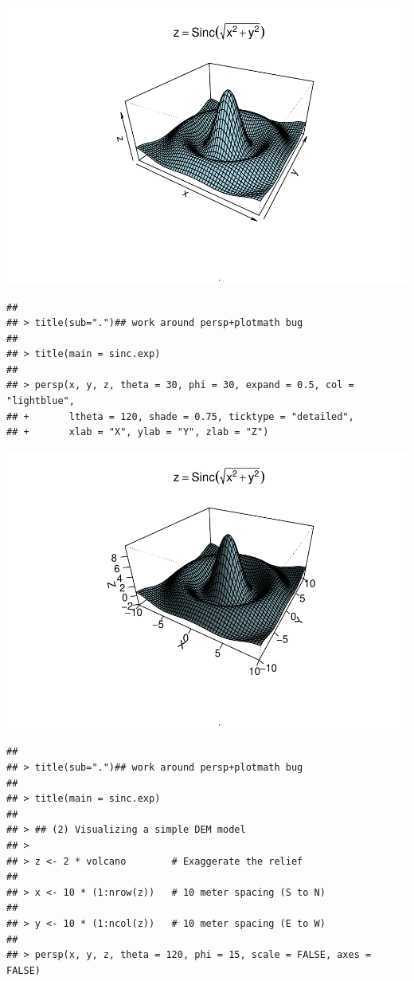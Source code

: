 \documentclass[]{book}
\begin{document}
\includegraphics{TudodoR_files/figure-latex/unnamed-chunk-146-1.pdf}

\begin{verbatim}
## 
## > title(sub=".")## work around persp+plotmath bug
## 
## > title(main = sinc.exp)
## 
## > persp(x, y, z, theta = 30, phi = 30, expand = 0.5, col = "lightblue",
## +       ltheta = 120, shade = 0.75, ticktype = "detailed",
## +       xlab = "X", ylab = "Y", zlab = "Z")
\end{verbatim}

\includegraphics{TudodoR_files/figure-latex/unnamed-chunk-146-2.pdf}

\begin{verbatim}
## 
## > title(sub=".")## work around persp+plotmath bug
## 
## > title(main = sinc.exp)
## 
## > ## (2) Visualizing a simple DEM model
## > 
## > z <- 2 * volcano        # Exaggerate the relief
## 
## > x <- 10 * (1:nrow(z))   # 10 meter spacing (S to N)
## 
## > y <- 10 * (1:ncol(z))   # 10 meter spacing (E to W)
## 
## > persp(x, y, z, theta = 120, phi = 15, scale = FALSE, axes = FALSE)
\end{verbatim}
\end{document}
